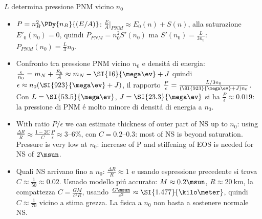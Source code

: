 \begin{frame}{$L$ determina pressione PNM vicino $n_0$}
    \begin{itemize}
        \item $P=n_B^2\PDy{n_B}{(E/A)}$: $\frac{E}{A}|_{PNM}\approx E_0(n)+S(n)$, alla saturazione $E'_0(n_0)=0$, quindi $P_{PNM}=n_0^2S'(n_0)$ ma $S'(n_0)=\frac{L}{3n_0}$: $P_{PNM}(n_0)=\frac{L}{3}n_0$.
        \item Confronto tra pressione PNM vicino $n_0$ e densit\'a di energia: $\frac{\epsilon}{n_0}=m_N+\frac{E_b}{A}\approx m_N-\SI{16}{\mega\ev}+J$ quindi $\epsilon\approx n_0(\SI{923}{\mega\ev}+J)$, il rapporto $\frac{P}{\epsilon}=\frac{L/3n_0}{(\SI{923}{\mega\ev}+J)n_0}$. Con $L=\SI{53.5}{\mega\ev}$, $J=\SI{23.3}{\mega\ev}$ si ha $\frac{P}{\epsilon}\approx\num{0.019}$: la pressione di PNM \'e molto minore di densit\'a di energia a $n_0$.
        \item With ratio $P/\epsilon$ we can estimate thickness of outer part of NS up to $n_0$: using $\frac{\Delta R}{R}\approx \frac{1-2C}{C}\frac{P}{\epsilon}\approx\numrange{3}{6}\%$, con $C=\numrange{0.2}{0.3}$: most of NS is beyond saturation. Pressure is very low at $n_0$: increase of P and stiffening of EOS is needed for NS of $2\msun$.
        \item Quali NS arrivano fino a $n_0$: $\frac{\Delta R}{R}\approx1$ e usando espressione precedente si trova $C\approx \frac{1}{50}\approx0.02$. Usnado modello pi\'u accurato: $M\approx0.2\msun$, $R\approx\SI{20}{\kilo\meter}$, la compattezza $C=\frac{GM}{c^2R}$, usando $\frac{G\msun}{c^2}\approx\SI{1.477}{\kilo\meter}$, quindi $C\approx \frac{1}{70}$ vicino a stima grezza. La fisica a $n_0$ non basta a sostenere normale NS.
    \end{itemize}
\end{frame}

